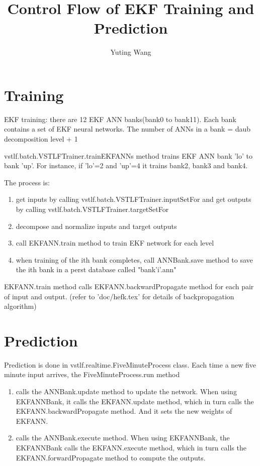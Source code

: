 \documentclass[letterpaper]{article}
\title{Control Flow of EKF Training and Prediction}
\author{Yuting Wang}
\begin{document}
\maketitle


\section{Training}
EKF training: there are 12 EKF ANN banks(bank0 to bank11). Each bank contains a set of EKF neural networks. The number of ANNs in a bank = daub decomposition level + 1
	

vstlf.batch.VSTLFTrainer.trainEKFANNs method trains EKF ANN bank 'lo' to bank 'up'. For instance, if 'lo'=2 and 'up'=4 it trains bank2, bank3 and bank4. 


The process is:
\begin{enumerate}
  \item get inputs by calling vstlf.batch.VSTLFTrainer.inputSetFor and get outputs by calling vstlf.batch.VSTLFTrainer.targetSetFor
  \item decompose and normalize inputs and target outputs
  \item call EKFANN.train method to train EKF network for each level
  \item when training of the ith bank completes, call ANNBank.save method to save the ith bank in a perst database called "bank'i'.ann"
\end{enumerate}


EKFANN.train method calls EKFANN.backwardPropagate method for each pair of input and output. (refer to 'doc/hefk.tex' for details of backpropagation algorithm)


\section{Prediction}

Prediction is done in vstlf.realtime.FiveMinuteProcess class. Each time a new five minute input arrives, the FiveMinuteProcess.run method

\begin{enumerate}
  \item calls the ANNBank.update method to update the network. When using EKFANNBank, it calls the EKFANN.update method, which in turn calls the EKFANN.backwardPropagate method. And it sets the new weights of EKFANN.
  \item calls the ANNBank.execute method. When using EKFANNBank, the EKFANNBank calls the  EKFANN.execute method, which in turn calls the EKFANN.forwardPropagate method to compute the outputs.
\end{enumerate}
\end{document}
